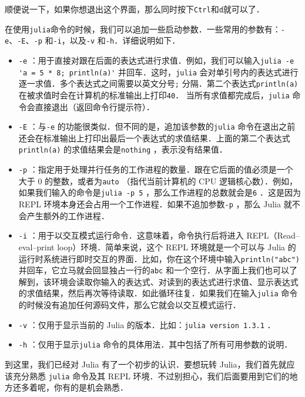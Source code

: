 顺便说一下，如果你想退出这个界面，那么同时按下\verb|Ctrl|和\verb|d|就可以了．

在使用\verb|julia|命令的时候，我们可以追加一些启动参数．一些常用的参数有：\verb|-e|、\verb|-E|、\verb|-p| 和\verb|-i|，以及\verb|-v| 和\verb|-h|．详细说明如下．

\begin{itemize}
\item \verb|-e| ：用于直接对跟在后面的表达式进行求值．例如，我们可以输入\verb|julia -e 'a = 5 * 8; println(a)'| 并回车．这时，\verb|julia| 会对单引号内的表达式进行逐一求值．多个表达式之间需要以英文分号\verb|;| 分隔．第二个表达式\verb|println(a)| 在被求值时会在计算机的标准输出上打印\verb|40|． 当所有求值都完成后，\verb|julia| 命令会直接退出（返回命令行提示符）．
\item \verb|-E| ：与\verb|-e| 的功能很类似．但不同的是，追加该参数的\verb|julia| 命令在退出之前还会在标准输出上打印出最后一个表达式的求值结果．上面的第二个表达式\verb|println(a)| 的求值结果会是\verb|nothing| ，表示没有结果值．
\item \verb|-p| ：指定用于处理并行任务的工作进程的数量．跟在它后面的值必须是一个大于 0 的整数，或者为\verb|auto| （指代当前计算机的 CPU 逻辑核心数）．例如，如果我们输入的命令是\verb|julia -p 5| ，那么工作进程的总数就会是\verb|6| ．这是因为 REPL 环境本身还会占用一个工作进程．如果不追加参数\verb|-p| ，那么 Julia 就不会产生额外的工作进程．
\item \verb|-i| ：用于以交互模式运行命令．这意味着，命令执行后将进入 REPL（Read–eval–print loop）环境．简单来说，这个 REPL 环境就是一个可以与 Julia 的运行时系统进行即时交互的界面．比如，你在这个环境中输入\verb|println("abc")| 并回车，它立马就会回显独占一行的\verb|abc| 和一个空行．从字面上我们也可以了解到，该环境会读取你输入的表达式、对读到的表达式进行求值、显示表达式的求值结果，然后再次等待读取．如此循环往复．如果我们在输入\verb|julia| 命令的时候没有追加任何源码文件，那么它就会以交互模式运行．
\item \verb|-v| ：仅用于显示当前的 Julia 的版本．比如：\verb|julia version 1.3.1| ．
\item \verb|-h| ：仅用于显示\verb|julia| 命令的具体用法．其中包括了所有可用参数的说明．
\end{itemize}

到这里，我们已经对 Julia 有了一个初步的认识．要想玩转 Julia，我们首先就应该充分熟悉 \verb|julia| 命令及其 REPL 环境．不过别担心，我们后面要用到它们的地方还多着呢，你有的是机会熟悉．

